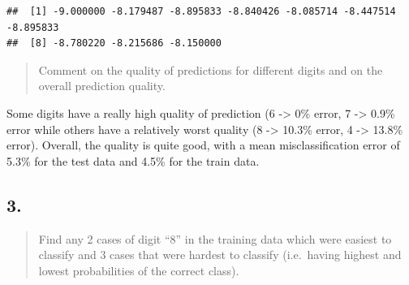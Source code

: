 \documentclass[
]{article}
\begin{document}
\begin{verbatim}
##  [1] -9.000000 -8.179487 -8.895833 -8.840426 -8.085714 -8.447514 -8.895833
##  [8] -8.780220 -8.215686 -8.150000
\end{verbatim}

\begin{quote}
Comment on the quality of predictions for different digits and on the
overall prediction quality.
\end{quote}

Some digits have a really high quality of prediction (6 -\textgreater{}
0\% error, 7 -\textgreater{} 0.9\% error while others have a relatively
worst quality (8 -\textgreater{} 10.3\% error, 4 -\textgreater{} 13.8\%
error). Overall, the quality is quite good, with a mean
misclassification error of 5.3\% for the test data and 4.5\% for the
train data.

\hypertarget{section-2}{%
\subsection{3.}\label{section-2}}

\begin{quote}
Find any 2 cases of digit ``8'' in the training data which were easiest
to classify and 3 cases that were hardest to classify (i.e.~having
highest and lowest probabilities of the correct class).
\end{quote}
\end{document}

